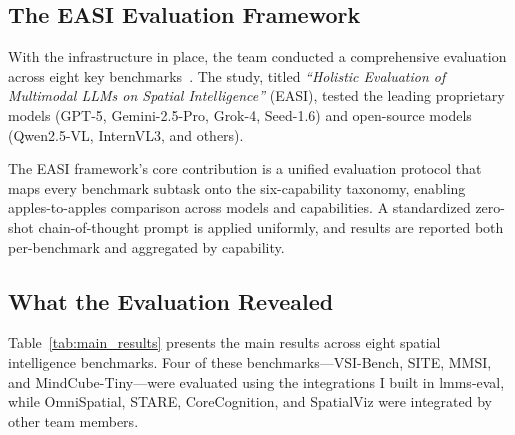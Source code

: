\documentclass[
hf,
]{confart}
\begin{document}
\subsection{The EASI Evaluation Framework}

With the infrastructure in place, the team conducted a comprehensive evaluation across eight key benchmarks~\cite{cai2025holisticevaluationmultimodalllms}. The study, titled \textit{``Holistic Evaluation of Multimodal LLMs on Spatial Intelligence''} (EASI), tested the leading proprietary models (GPT-5, Gemini-2.5-Pro, Grok-4, Seed-1.6) and open-source models (Qwen2.5-VL, InternVL3, and others).

The EASI framework's core contribution is a unified evaluation protocol that maps every benchmark subtask onto the six-capability taxonomy, enabling apples-to-apples comparison across models and capabilities. A standardized zero-shot chain-of-thought prompt is applied uniformly, and results are reported both per-benchmark and aggregated by capability.

\subsection{What the Evaluation Revealed}

Table~\ref{tab:main_results} presents the main results across eight spatial intelligence benchmarks. Four of these benchmarks---VSI-Bench, SITE, MMSI, and MindCube-Tiny---were evaluated using the integrations I built in lmms-eval, while OmniSpatial, STARE, CoreCognition, and SpatialViz were integrated by other team members.
\end{document}
